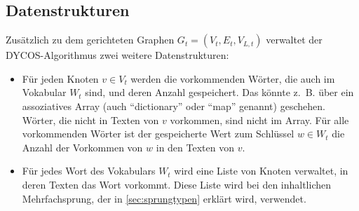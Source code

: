 \subsection{Datenstrukturen}
Zusätzlich zu dem gerichteten Graphen $G_t = (V_t, E_t, V_{L,t})$ 
verwaltet der DYCOS-Algorithmus zwei weitere Datenstrukturen:
\begin{itemize}
    \item Für jeden Knoten $v \in V_t$ werden die vorkommenden Wörter,
          die auch im Vokabular $W_t$ sind,
          und deren Anzahl gespeichert. Das könnte z.~B. über ein 
          assoziatives Array (auch \enquote{dictionary} oder 
            \enquote{map} genannt) geschehen. Wörter, die nicht in 
          Texten von $v$ vorkommen, sind nicht im Array. Für
          alle vorkommenden Wörter ist der gespeicherte Wert zum 
          Schlüssel $w \in W_t$ die Anzahl der Vorkommen von 
          $w$ in den Texten von $v$.
    \item Für jedes Wort des Vokabulars $W_t$ wird eine Liste von 
          Knoten verwaltet, in deren Texten das Wort vorkommt.
          Diese Liste wird bei den inhaltlichen Mehrfachsprung,
          der in \cref{sec:sprungtypen} erklärt wird,
          verwendet.
\end{itemize}



